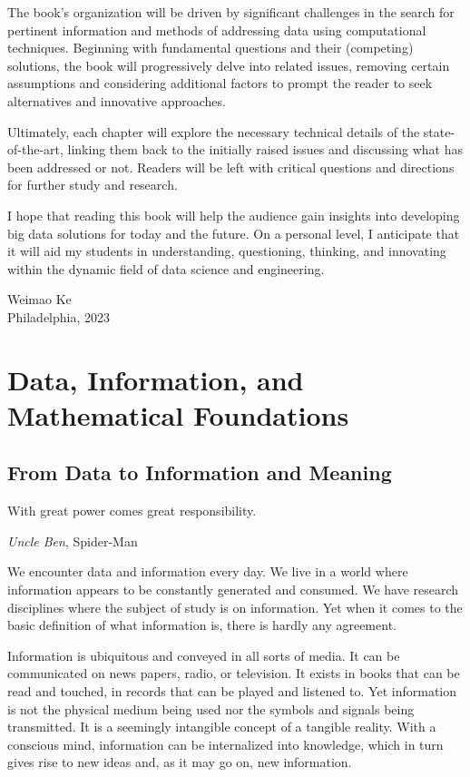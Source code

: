 \documentclass[
  letterpaper,
]{scrbook}
\begin{document}
The book's organization will be driven by significant challenges in the
search for pertinent information and methods of addressing data using
computational techniques. Beginning with fundamental questions and their
(competing) solutions, the book will progressively delve into related
issues, removing certain assumptions and considering additional factors
to prompt the reader to seek alternatives and innovative approaches.

Ultimately, each chapter will explore the necessary technical details of
the state-of-the-art, linking them back to the initially raised issues
and discussing what has been addressed or not. Readers will be left with
critical questions and directions for further study and research.

I hope that reading this book will help the audience gain insights into
developing big data solutions for today and the future. On a personal
level, I anticipate that it will aid my students in understanding,
questioning, thinking, and innovating within the dynamic field of data
science and engineering.

Weimao Ke\\
Philadelphia, 2023

\part{Data, Information, and Mathematical Foundations}

\chapter{From Data to Information and Meaning}\label{ch-data-meaning}

With great power comes great responsibility.

\emph{Uncle Ben}, Spider-Man

We encounter data and information every day. We live in a world where
information appears to be constantly generated and consumed. We have
research disciplines where the subject of study is on information. Yet
when it comes to the basic definition of what information is, there is
hardly any agreement.

Information is ubiquitous and conveyed in all sorts of media. It can be
communicated on news papers, radio, or television. It exists in books
that can be read and touched, in records that can be played and listened
to. Yet information is not the physical medium being used nor the
symbols and signals being transmitted. It is a seemingly intangible
concept of a tangible reality. With a conscious mind, information can be
internalized into knowledge, which in turn gives rise to new ideas and,
as it may go on, new information.
\end{document}
